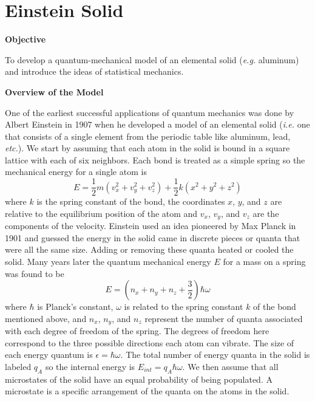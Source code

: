 \section{Einstein Solid}

\makelabheader %

\textbf{Objective}

To develop a quantum-mechanical model of an elemental solid ({\it e.g.} aluminum) and
introduce the ideas of statistical mechanics.

\textbf{Overview of the Model}

One of the earliest successful applications of quantum mechanics was done by Albert Einstein
in 1907 when he developed a model of an elemental solid ({\it i.e.} one that consists of a single
element from the periodic table like aluminum, lead, {\it etc.}).
We start by assuming that each atom in the solid is bound in a square lattice with each
of six neighbors. Each bond is treated as a simple spring so the 
mechanical energy for a single atom is
%
%
%
\begin{equation}
E = \frac{1}{2} m (v_x^2 + v_y^2 + v_z^2) + \frac{1}{2} k (x^2 + y^2 + z^2)
\end{equation}
where $k$ is the spring constant of the bond, the coordinates $x$, $y$, and $z$ are relative to the
equilibrium position of the atom and $v_x$, $v_y$, and $v_z$ are the components of the velocity.
Einstein used an idea pioneered by Max Planck in 1901 and
guessed the energy in the solid came in discrete pieces or quanta that were all
the same size.
Adding or removing these quanta heated or cooled the solid.
Many years later the quantum mechanical energy $E$ for a mass on a spring was found 
to be
\begin{equation}
E = (n_x + n_y + n_z + \frac{3}{2})\hbar \omega
\end{equation}
where $\hbar$ is Planck's constant, $\omega$ is related to the spring constant $k$ of the bond
mentioned
above, and $n_x$, $n_y$, and $n_z$ represent the number of quanta associated with each
degree of freedom of the spring.
The degrees of freedom here correspond to the three possible directions each atom can vibrate.
The size of each energy quantum is $\epsilon = \hbar \omega$.
The total number of energy quanta in the solid is labeled $q_A$ so the internal energy is
$E_{int} = q_A\hbar\omega$.
We then assume that all microstates of the solid have an equal probability of being populated.
A microstate is a specific arrangement of the quanta on the atoms in the solid.

